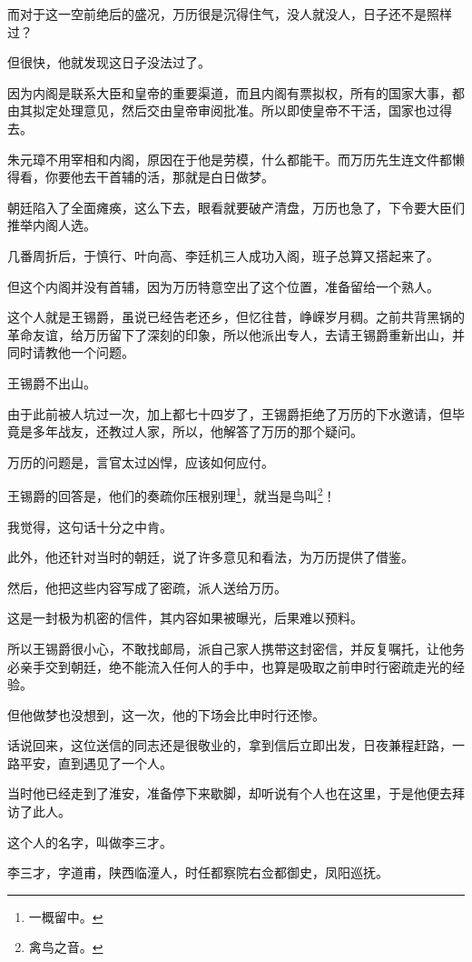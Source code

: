 \begin{multicols}{\theparacolNo}
		而对于这一空前绝后的盛况，万历很是沉得住气，没人就没人，日子还不是照样过？

		但很快，他就发现这日子没法过了。

		因为内阁是联系大臣和皇帝的重要渠道，而且内阁有票拟权，所有的国家大事，都由其拟定处理意见，然后交由皇帝审阅批准。所以即使皇帝不干活，国家也过得去。

		朱元璋不用宰相和内阁，原因在于他是劳模，什么都能干。而万历先生连文件都懒得看，你要他去干首辅的活，那就是白日做梦。

		朝廷陷入了全面瘫痪，这么下去，眼看就要破产清盘，万历也急了，下令要大臣们推举内阁人选。

		几番周折后，于慎行、叶向高、李廷机三人成功入阁，班子总算又搭起来了。

		但这个内阁并没有首辅，因为万历特意空出了这个位置，准备留给一个熟人。

		这个人就是王锡爵，虽说已经告老还乡，但忆往昔，峥嵘岁月稠。之前共背黑锅的革命友谊，给万历留下了深刻的印象，所以他派出专人，去请王锡爵重新出山，并同时请教他一个问题。

		王锡爵不出山。

		由于此前被人坑过一次，加上都七十四岁了，王锡爵拒绝了万历的下水邀请，但毕竟是多年战友，还教过人家，所以，他解答了万历的那个疑问。

		万历的问题是，言官太过凶悍，应该如何应付。

		王锡爵的回答是，他们的奏疏你压根别理\footnote{一概留中。}，就当是鸟叫\footnote{禽鸟之音。}！

		我觉得，这句话十分之中肯。

		此外，他还针对当时的朝廷，说了许多意见和看法，为万历提供了借鉴。

		然后，他把这些内容写成了密疏，派人送给万历。

		这是一封极为机密的信件，其内容如果被曝光，后果难以预料。

		所以王锡爵很小心，不敢找邮局，派自己家人携带这封密信，并反复嘱托，让他务必亲手交到朝廷，绝不能流入任何人的手中，也算是吸取之前申时行密疏走光的经验。

		但他做梦也没想到，这一次，他的下场会比申时行还惨。

		话说回来，这位送信的同志还是很敬业的，拿到信后立即出发，日夜兼程赶路，一路平安，直到遇见了一个人。

		当时他已经走到了淮安，准备停下来歇脚，却听说有个人也在这里，于是他便去拜访了此人。

		这个人的名字，叫做李三才。

		李三才，字道甫，陕西临潼人，时任都察院右佥都御史，凤阳巡抚。


\end{multicols}
